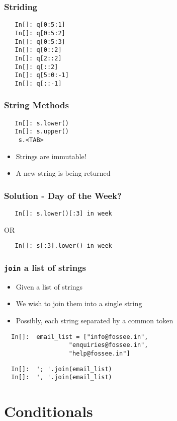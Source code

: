 \begin{frame}[fragile]
  \frametitle{Striding}
  \begin{lstlisting}
   In[]: q[0:5:1]
   In[]: q[0:5:2]
   In[]: q[0:5:3]
   In[]: q[0::2]
   In[]: q[2::2]
   In[]: q[::2]
   In[]: q[5:0:-1]
   In[]: q[::-1]
  \end{lstlisting}
\end{frame}

\begin{frame}[fragile]
  \frametitle{String Methods} 
  \begin{lstlisting}
   In[]: s.lower()
   In[]: s.upper()
    s.<TAB>
  \end{lstlisting}
  \begin{itemize}
  \item \alert{Strings are immutable!}
  \item A new string is being returned
  \end{itemize}
\end{frame}

\begin{frame}[fragile]
  \frametitle{Solution - Day of the Week?}
  \begin{lstlisting}
   In[]: s.lower()[:3] in week
  \end{lstlisting}
  OR
  \begin{lstlisting}
   In[]: s[:3].lower() in week
  \end{lstlisting}
\end{frame}

\begin{frame}[fragile]
  \frametitle{\texttt{join} a list of strings}
  \begin{itemize}
  \item Given a list of strings
  \item We wish to join them into a single string
  \item Possibly, each string separated by a common token
  \end{itemize}
  \begin{lstlisting}
  In[]:  email_list = ["info@fossee.in", 
                  "enquiries@fossee.in",
                  "help@fossee.in"]
  \end{lstlisting}
  \begin{lstlisting}
  In[]:  '; '.join(email_list)
  In[]:  ', '.join(email_list)
  \end{lstlisting}
\end{frame}

\section{Conditionals}

